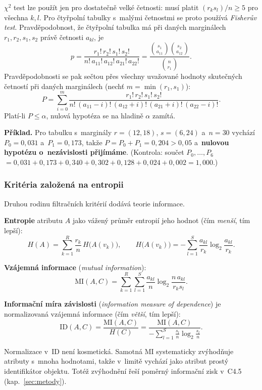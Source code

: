 \documentclass[11pt,a4paper]{article}
\theoremstyle{definition}
\begin{document}
\begin{defbox}
$\chi^2$ test lze použít jen pro dostatečně velké četnosti: musí platit $(r_k s_l)/n\ge 5$
pro všechna $k,l$. Pro čtyřpolní tabulky s~malými četnostmi se proto používá \emph{Fisherův
test}. Pravděpodobnost, že čtyřpolní tabulka má při daných marginálech $r_1,r_2,s_1,s_2$
právě četnosti $a_{kl}$, je
\[ p=\frac{r_1!\,r_2!\,s_1!\,s_2!}{n!\,a_{11}!\,a_{12}!\,a_{21}!\,a_{22}!}
     =\frac{\binom{s_1}{a_{11}}\binom{s_2}{a_{12}}}{\binom{n}{r_1}}. \]
Pravděpodobnosti se pak sečtou přes všechny uvažované hodnoty skutečných četností při daných
marginálech (nechť $m=\min(r_1,s_1)$):
\[ P=\sum_{i=0}^{m}\frac{r_1!\,r_2!\,s_1!\,s_2!}{n!\,(a_{11}-i)!\,(a_{12}+i)!\,(a_{21}+i)!\,(a_{22}-i)!}. \]
Platí-li $P\le\alpha$, nulová hypotéza se na hladině $\alpha$ zamítá.

\textbf{Příklad.} Pro tabulku s~marginály $r=(12,18)$, $s=(6,24)$ a~$n=30$ vychází
$P_0=0{,}031$ a~$P_1=0{,}173$, takže $P=P_0+P_1=0{,}204>0{,}05$ a~\textbf{nulovou hypotézu
o~nezávislosti přijímáme}. (Kontrola: součet $P_0,\dots,P_6$
$=0{,}031+0{,}173+0{,}340+0{,}302+0{,}128+0{,}024+0{,}002=1{,}000$.)
\end{defbox}

\subsubsection{Kritéria založená na entropii}

Druhou rodinu filtračních kritérií dodává teorie informace.

\begin{defbox}
\textbf{Entropie} atributu $A$ jako vážený průměr entropií jeho hodnot
(čím \emph{menší}, tím lepší):
\[ H(A)=\sum_{k=1}^{R}\frac{r_k}{n}\,H\big(A(v_k)\big),\qquad
   H\big(A(v_k)\big)=-\sum_{l=1}^{S}\frac{a_{kl}}{r_k}\log_2\frac{a_{kl}}{r_k}. \]

\textbf{Vzájemná informace} (\emph{mutual information}):
\[ \mathrm{MI}(A,C)=\sum_{k=1}^{R}\sum_{l=1}^{S}\frac{a_{kl}}{n}
   \log_2\frac{n\,a_{kl}}{r_k s_l}. \]

\textbf{Informační míra závislosti} (\emph{information measure of dependence}) je
normalizovaná vzájemná informace (čím \emph{větší}, tím lepší):
\[ \mathrm{ID}(A,C)=\frac{\mathrm{MI}(A,C)}{H(C)}
   =\frac{\mathrm{MI}(A,C)}{-\sum_{l=1}^{S}\frac{s_l}{n}\log_2\frac{s_l}{n}}. \]
\end{defbox}

Normalizace v~$\mathrm{ID}$ není kosmetická. Samotná $\mathrm{MI}$ systematicky zvýhodňuje
atributy s~mnoha hodnotami, takže v~limitě vychází jako  atribut prostý
identifikátor objektu. Totéž zvýhodnění řeší poměrný informační zisk v~C4.5
(kap.~\ref{sec:metody}).
\end{document}
